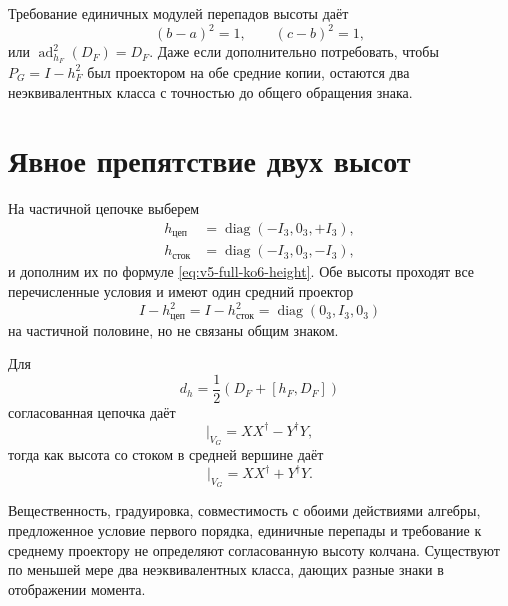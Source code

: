 Требование единичных модулей перепадов высоты даёт
\begin{equation}
 (b-a)^2=1,\qquad(c-b)^2=1,
 \label{eq:v5-unit-height-gaps}
\end{equation}
или \(\operatorname{ad}_{h_F}^2(D_F)=D_F\). Даже если дополнительно
потребовать, чтобы \(P_G=I-h_F^2\) был проектором на обе средние копии,
остаются два неэквивалентных класса с точностью до общего обращения знака.

\section{Явное препятствие двух высот}

На частичной цепочке выберем
\begin{align}
 h_{\text{цеп}}&=\operatorname{diag}(-I_3,0_3,+I_3),\\
 h_{\text{сток}}&=\operatorname{diag}(-I_3,0_3,-I_3),
\end{align}
и дополним их по формуле \eqref{eq:v5-full-ko6-height}. Обе высоты проходят
все перечисленные условия и имеют один средний проектор
\begin{equation}
 I-h_{\text{цеп}}^2=I-h_{\text{сток}}^2
 =\operatorname{diag}(0_3,I_3,0_3)
\end{equation}
на частичной половине, но не связаны общим знаком.

Для
\begin{equation}d_h=\frac12(D_F+[h_F,D_F])\end{equation}
согласованная цепочка даёт
\begin{equation}
 [d_{\text{цеп}},d_{\text{цеп}}^\dagger]\big|_{V_G}
 =XX^\dagger-Y^\dagger Y,
 \label{eq:v5-chain-height-difference}
\end{equation}
тогда как высота со стоком в средней вершине даёт
\begin{equation}
 [d_{\text{сток}},d_{\text{сток}}^\dagger]\big|_{V_G}
 =XX^\dagger+Y^\dagger Y.
 \label{eq:v5-sink-height-sum}
\end{equation}

\begin{theorem}
Вещественность, градуировка, совместимость с обоими действиями алгебры,
предложенное условие первого порядка, единичные перепады и требование к
среднему проектору не определяют согласованную высоту колчана. Существуют по
меньшей мере два неэквивалентных класса, дающих разные знаки в отображении
момента.
\end{theorem}

